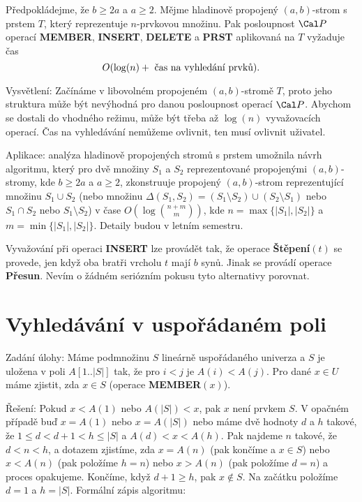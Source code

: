 \documentclass[a4paper,12pt]{article}
\begin{document}
Předpokládejme, že $b\ge 2a$ a $a\ge 2$. Mějme 
hladinově propojený $(a,b)$-strom s prstem $T$, který reprezentuje 
$n$-prvkovou množinu. Pak posloupnost $\Cal P$ operací {\bf MEMBER},
{\bf INSERT}, {\bf DELETE} a {\bf PRST} aplikovaná na $T$ vyžaduje čas 
$$O(\log(n)+\text{\rm\ čas na vyhledání prvků})
.$$
\endproclaim

Vysvětlení: Začínáme v libovolném 
propojeném $(a,b)$-stro\-mě $T$, proto jeho struktura 
může být nevýhodná pro danou pos\-loupnost operací $
\Cal P$. 
Abychom se dostali do vhodného režimu, může 
být třeba až $\log(n)$ vyvažovacích operací. Čas na 
vy\-hledává\-ní nemůžeme ovlivnit, ten musí 
ovlivnit uživatel.

Aplikace: analýza hladinově propojených stromů s prstem 
u\-mož\-nila návrh algoritmu, který pro dvě množiny $
S_1$ a $S_2$ 
repre\-zentované propojenými $(a,b)$-stromy, kde $b\ge 2a$ a 
$a\ge 2$, 
zkonstruuje propojený $(a,b)$-strom reprezentující množinu 
$S_1\cup S_2$ (nebo množinu $\Delta (S_1,S_2)=(S_1\setminus S_
2)\cup (S_2\setminus S_1)$ nebo 
$S_1\cap S_2$ nebo $S_1\setminus S_2$) v čase $O(\log\binom {n
+m}m)$, kde 
$n=\max\{|S_1|,|S_2|\}$ a $m=\min\{|S_1|,|S_2|\}$. Detaily budou v letním 
semestru.

Vyvažování při operaci {\bf INSERT} lze provádět 
tak, že operace {\bf Štěpení$(t)$} se provede, jen když oba 
bratři vrcholu $t$ mají $b$ synů. Jinak se provádí 
operace {\bf Přesun}. Nevím o žádném seriózním pokusu tyto 
alternativy porovnat.   

\section{Vyhledávání v uspořádaném poli}

Zadání úlohy: Máme podmnožinu $S$ lineárně 
uspořádaného univerza a $S$ je uložena v poli 
$A[1..|S|]$ tak, že pro $i<j$ je $A(i)<A(j)$. Pro dané $x\in 
U$ 
máme zjistit, zda $x\in S$ (operace {\bf MEMBER$(x)$}).

Řešení:  Pokud $x<A(1)$ nebo $A(|S|)<x$, pak $
x$ 
není prvkem $S$.  V opačném případě buď $x=
A(1)$ nebo 
$x=A(|S|)$ nebo máme dvě hodnoty $d$ 
a $h$ takové, že $1\le d<d+1<h\le |S|$ a $A(d)<x<A(h)$.  Pak 
najdeme $n$ takové, že $d<n<h$, a dotazem 
zjistíme, zda $x=A(n)$ (pak končíme a $x\in S$) nebo 
$x<A(n)$ (pak položíme $h=n$) nebo $x>A(n)$ (pak 
položíme $d=n$) a proces opakujeme.  Končíme, když 
$d+1\ge h$, pak $x\notin S$. Na začátku položíme $d=1$ a $
h=|S|$.
Formální zápis algoritmu:
\end{document}

